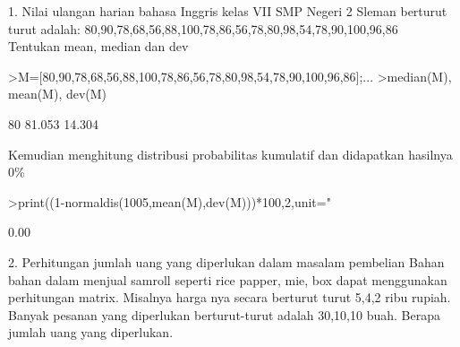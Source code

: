 \documentclass[12pt,arial,letterpaper]{book}
\begin{document}
\begin{eulernootebook}
\begin{eulercomment}
\begin{eulercomment}
\begin{eulernootebook}
\begin{eulercomment}
\begin{eulercomment}
\begin{eulercomment}
\begin{eulercomment}
\begin{eulercomment}
\begin{eulercomment}
\begin{eulercomment}
\begin{eulercomment}
\begin{eulercomment}
\begin{eulercomment}
\begin{eulercomment}
\begin{eulercomment}
\begin{eulercomment}
\begin{euleroutput}
  [0.34485,  0.080751,  0.87652,  0.75416,  0.68839]
\end{euleroutput}
\begin{eulercomment}
1. Nilai ulangan harian bahasa Inggris kelas VII SMP Negeri 2 Sleman
berturut turut adalah:
80,90,78,68,56,88,100,78,86,56,78,80,98,54,78,90,100,96,86\\
Tentukan mean, median dan dev
\end{eulercomment}
\begin{eulerprompt}
>M=[80,90,78,68,56,88,100,78,86,56,78,80,98,54,78,90,100,96,86];...
>median(M), mean(M), dev(M)
\end{eulerprompt}
\begin{euleroutput}
  80
  81.053
  14.304
\end{euleroutput}
\begin{eulercomment}
Kemudian menghitung distribusi probabilitas kumulatif dan didapatkan
hasilnya 0\%
\end{eulercomment}
\begin{eulerprompt}
>print((1-normaldis(1005,mean(M),dev(M)))*100,2,unit=" %
\end{eulerprompt}
\begin{euleroutput}
        0.00 %
\end{euleroutput}
\begin{eulercomment}
2. Perhitungan jumlah uang yang diperlukan dalam masalam pembelian
Bahan bahan dalam menjual samroll seperti rice papper, mie, box dapat
menggunakan perhitungan matrix. Misalnya harga nya secara berturut
turut 5,4,2 ribu rupiah. Banyak pesanan yang diperlukan berturut-turut
adalah 30,10,10 buah. Berapa jumlah uang yang diperlukan.

\end{eulercomment}
\begin{eulerttcomment}
 

\end{eulerttcomment}
\end{eulercomment}
\end{eulercomment}
\end{eulercomment}
\end{eulercomment}
\end{eulercomment}
\end{eulercomment}
\end{eulercomment}
\end{eulercomment}
\end{eulercomment}
\end{eulercomment}
\end{eulercomment}
\end{eulercomment}
\end{eulercomment}
\end{eulernootebook}
\end{eulercomment}
\end{eulercomment}
\end{eulernootebook}
\end{document}
